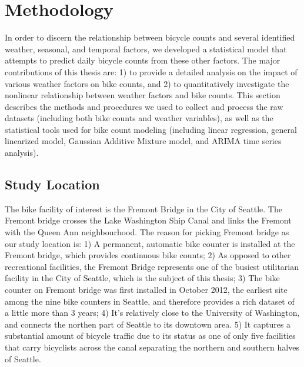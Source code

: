 \documentclass [11pt, proquest] {uwthesis}[2015/03/03]
\begin{document}
 
\chapter{Methodology}


In order to discern the relationship between bicycle counts and several identified weather, seasonal, and temporal factors, we
developed a statistical model that attempts to predict daily bicycle counts from these other factors. The major contributions of this thesis are: 1) to provide a detailed analysis on the impact of various weather factors on bike counts, and 2) to quantitatively investigate the nonlinear relationship between weather factors and bike counts. This section describes the methods
and procedures we used to collect and process the raw datasets (including both bike counts and weather variables), as well as the statistical tools used for bike count modeling (including linear regression, general linearized model, Gaussian Additive Mixture model, and ARIMA time series analysis). 

\section{Study Location}
The bike facility of interest is the Fremont Bridge in the City of Seattle. The Fremont bridge crosses the Lake Washington Ship Canal and links the Fremont with the Queen Ann neighbourhood. The reason for picking Fremont bridge as our study location is: 1) A permanent, automatic bike counter is installed at the Fremont bridge, which provides continuous bike counts; 2) As opposed to other recreational facilities, the Fremont Bridge represents one of the busiest utilitarian facility in the City of Seattle, which is the subject of this thesis; 3) The bike counter on Fremont bridge was first installed in October 2012, the earliest site among the nine bike counters in Seattle, and therefore provides a rich dataset of a little more than 3 years; 4) It's relatively close to the University of Washington, and connects the northen part of Seattle to its downtown area. 5) It captures a substantial amount of bicycle traffic due to its status as one of only five facilities that carry bicyclists across the canal separating the northern and southern halves of Seattle.
\end{document}
